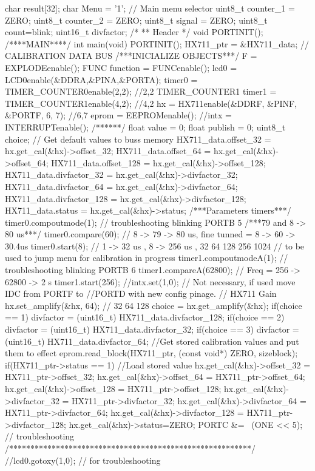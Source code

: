 \begin{verbatimtab}
char result[32];
char Menu = '1'; // Main menu selector
uint8_t counter_1 = ZERO;
uint8_t counter_2 = ZERO;
uint8_t signal = ZERO;
uint8_t count=blink;
uint16_t divfactor;
/*
** Header
*/
void PORTINIT();
/****MAIN****/
int main(void)
{
PORTINIT();
HX711_ptr = &HX711_data; // CALIBRATION DATA BUS
/***INICIALIZE OBJECTS***/
F = EXPLODEenable();
FUNC function = FUNCenable();
lcd0 = LCD0enable(&DDRA,&PINA,&PORTA);
timer0 = TIMER_COUNTER0enable(2,2); //2,2
TIMER_COUNTER1 timer1 = TIMER_COUNTER1enable(4,2); //4,2
hx = HX711enable(&DDRF, &PINF, &PORTF, 6, 7); //6,7
eprom = EEPROMenable();
//intx = INTERRUPTenable();
/******/
float value = 0;
float publish = 0;
uint8_t choice;
// Get default values to buss memory
HX711_data.offset_32 = hx.get_cal(&hx)->offset_32;
HX711_data.offset_64 = hx.get_cal(&hx)->offset_64;
HX711_data.offset_128 = hx.get_cal(&hx)->offset_128;
HX711_data.divfactor_32 = hx.get_cal(&hx)->divfactor_32;
HX711_data.divfactor_64 = hx.get_cal(&hx)->divfactor_64;
HX711_data.divfactor_128 = hx.get_cal(&hx)->divfactor_128;
HX711_data.status = hx.get_cal(&hx)->status;
/***Parameters timers***/
timer0.compoutmode(1); // troubleshooting blinking PORTB 5
/***79 and 8  -> 80 us***/
timer0.compare(60); // 8 -> 79 -> 80 us, fine tunned = 8 -> 60 -> 30.4us
timer0.start(8); // 1 -> 32 us , 8 -> 256 us , 32 64 128 256 1024
// to be used to jump menu for calibration in progress
timer1.compoutmodeA(1); // troubleshooting blinking PORTB 6
timer1.compareA(62800); // Freq = 256 -> 62800 -> 2 s
timer1.start(256);
//intx.set(1,0); // Not necessary, if used move IDC from PORTF to
//PORTD with new config pinage.
// HX711 Gain
hx.set_amplify(&hx, 64); // 32 64 128
choice = hx.get_amplify(&hx);
if(choice == 1)
divfactor = (uint16_t) HX711_data.divfactor_128;
if(choice == 2)
divfactor = (uint16_t) HX711_data.divfactor_32;
if(choice == 3)
divfactor = (uint16_t) HX711_data.divfactor_64;
//Get stored calibration values and put them to effect
eprom.read_block(HX711_ptr, (const void*) ZERO, sizeblock);
if(HX711_ptr->status == 1){
    //Load stored value 
    hx.get_cal(&hx)->offset_32 = HX711_ptr->offset_32;
    hx.get_cal(&hx)->offset_64 = HX711_ptr->offset_64;
    hx.get_cal(&hx)->offset_128 = HX711_ptr->offset_128;
    hx.get_cal(&hx)->divfactor_32 = HX711_ptr->divfactor_32;
    hx.get_cal(&hx)->divfactor_64 = HX711_ptr->divfactor_64;
    hx.get_cal(&hx)->divfactor_128 = HX711_ptr->divfactor_128;
    hx.get_cal(&hx)->status=ZERO;
    PORTC &= ~(ONE << 5); // troubleshooting
}
/*********************************************************/
//lcd0.gotoxy(1,0); // for troubleshooting
}
\end{verbatimtab}
